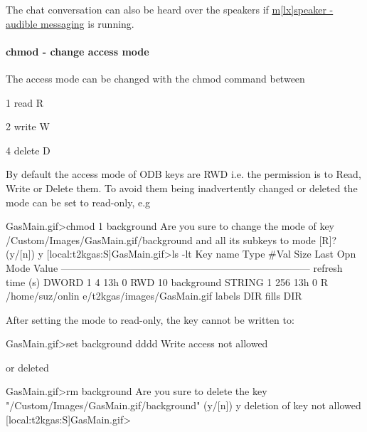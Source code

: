 The chat conversation can also be heard over the speakers if \hyperlink{F_Messaging_F_mspeaker_utility}{m\mbox{[}lx\mbox{]}speaker -\/ audible messaging} is running.

\label{RC_odbedit_examples_idx_access-control_ODB_keys}
\hypertarget{RC_odbedit_examples_idx_access-control_ODB_keys}{}
 

\hypertarget{RC_odbedit_examples_RC_odbedit_chmod}{}\paragraph{chmod -\/ change access mode}\label{RC_odbedit_examples_RC_odbedit_chmod}
The access mode can be changed with the chmod command between


\begin{DoxyItemize}
\item 1 read R
\item 2 write W
\item 4 delete D
\end{DoxyItemize}

By default the access mode of ODB keys are RWD i.e. the permission is to Read, Write or Delete them. To avoid them being inadvertently changed or deleted the mode can be set to read-\/only, e.g 
\begin{DoxyCode}
GasMain.gif>chmod 1 background
Are you sure to change the mode of key
  /Custom/Images/GasMain.gif/background
and all its subkeys
to mode [R]? (y/[n]) y
[local:t2kgas:S]GasMain.gif>ls -lt
Key name                        Type    #Val  Size  Last Opn Mode Value
---------------------------------------------------------------------------
refresh time (s)                DWORD   1     4     13h  0   RWD  10
background                      STRING  1     256   13h  0   R    /home/suz/onlin
      e/t2kgas/images/GasMain.gif
labels                          DIR
fills                           DIR
\end{DoxyCode}
 After setting the mode to read-\/only, the key cannot be written to: 
\begin{DoxyCode}
GasMain.gif>set background dddd
Write access not allowed
\end{DoxyCode}
 or deleted 
\begin{DoxyCode}
GasMain.gif>rm background
Are you sure to delete the key
"/Custom/Images/GasMain.gif/background"
(y/[n]) y
deletion of key not allowed
[local:t2kgas:S]GasMain.gif> 
\end{DoxyCode}


